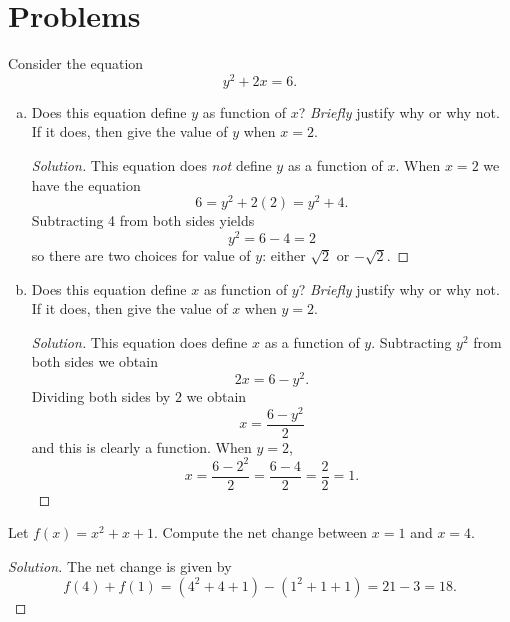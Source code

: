 \documentclass[12pt]{amsart}
\begin{document}
\section{Problems}
\begin{thm}[16 Points]\label{ex7}
  Consider the equation
  $$y^2 + 2x = 6.$$
  \begin{enumerate}[(a)]
    \item
      Does this equation define $y$ as function of $x$?  
      \emph{Briefly} justify why or why not.
      If it does, then give the value of $y$ when $x = 2$.
      \begin{proof}[Solution]
        This equation does \emph{not} define $y$ as a function of $x$.
      When $x = 2$ we have the equation
      $$6 = y^2 + 2(2) = y^2 + 4.$$
      Subtracting 4 from both sides yields
      $$y^2 = 6 - 4 = 2$$
      so there are two choices for value of $y$: either $\sqrt{2}$ or $-\sqrt{2}$.
      \end{proof}
    \item
      Does this equation define $x$ as function of $y$?  \emph{Briefly} justify why or why not.
      If it does, then give the value of $x$ when $y = 2$.
      \begin{proof}[Solution]
        This equation does define $x$ as a function of $y$.
        Subtracting $y^2$ from both sides we obtain
        $$2x = 6 - y^2.$$
        Dividing both sides by $2$ we obtain
        $$x = \frac{6 - y^2}{2}$$
        and this is clearly a function.
        When $y = 2$,
        $$x = \frac{6 - 2^2}{2} = \frac{6 - 4}{2} = \frac{2}{2} = 1.$$
    \end{proof}
  \end{enumerate}
\end{thm}

\begin{thm}[16 Points]\label{ex8}
  Let $f(x) = x^2 + x + 1$.  Compute the net change between $x = 1$ and $x = 4$.
  \begin{proof}[Solution]
    The net change is given by
    $$f(4) + f(1) = (4^2 + 4 + 1) - (1^2 + 1 + 1) = 21 - 3 = 18.$$
  \end{proof}
\end{thm}

\newpage
\end{document}
